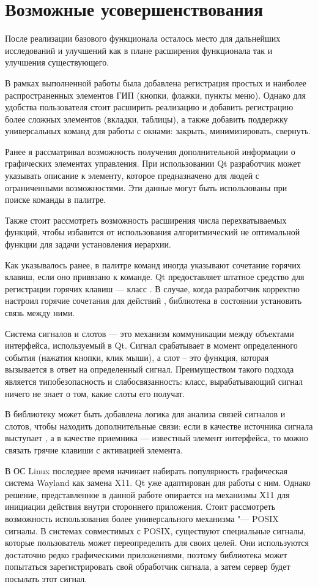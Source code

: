 \section{Возможные усовершенствования}

После реализации базового функционала осталось место для дальнейших
исследований и улучшений как в плане расширения функционала так и улучшения
существующего.

В рамках выполненной работы была добавлена регистрация простых и наиболее
распространенных элементов ГИП (кнопки, флажки, пункты меню). Однако для
удобства пользователя стоит расширить реализацию и добавить регистрацию более
сложных элементов (вкладки, таблицы), а также добавить поддержку универсальных
команд для работы с окнами: закрыть, минимизировать, свернуть.

Ранее я рассматривал \cite{polshakovvoice} возможность получения дополнительной
информации о графических элементах управления. При использовании Qt разработчик
может указывать описание к элементу, которое предназначено для людей с
ограниченными возможностями. Эти данные могут быть использованы при поиске
команды в палитре.

Также стоит рассмотреть возможность расширения числа перехватываемых функций,
чтобы избавится от использования алгоритмический не оптимальной функции для
задачи установления иерархии.

Как указывалось ранее, в палитре команд иногда указывают сочетание горячих
клавиш, если оно привязано к команде. Qt предоставляет штатное средство для
регистрации горячих клавиш — класс . В случае, когда разработчик
корректно настроил горячие сочетания для действий , библиотека в
состоянии установить связь между ними.

Система сигналов и слотов — это механизм коммуникации между объектами
интерфейса, используемый в Qt. Сигнал срабатывает в момент определенного
события (нажатия кнопки, клик мыши), а слот – это функция, которая вызывается
в ответ на определенный сигнал. Преимуществом такого подхода является
типобезопасность и слабосвязанность: класс, вырабатывающий сигнал ничего не
знает о том, какие слоты его получат.

В библиотеку может быть добавлена логика для анализа связей сигналов и слотов,
чтобы находить дополнительные связи: если в качестве источника сигнала выступает
, а в качестве приемника — известный элемент интерфейса, то
можно связать грячие клавиши с активацией элемента.

В ОС Linux последнее время начинает набирать популярность графическая система
Wayland как замена X11\cite{wayland}. Qt уже адаптирован для работы с ним.
Однако решение, представленное в данной работе опирается на механизмы Х11 для
инициации действия внутри стороннего приложения. Стоит рассмотреть возможность
использования более универсального механизма "--- POSIX сигналы. В системах
совместимых с POSIX, существуют специальные сигналы, которые пользователь может
переопределить для своих целей. Они используются достаточно редко графическими
приложениями, поэтому библиотека может попытаться зарегистрировать свой
обработчик сигнала, а затем сервер будет посылать этот сигнал.
